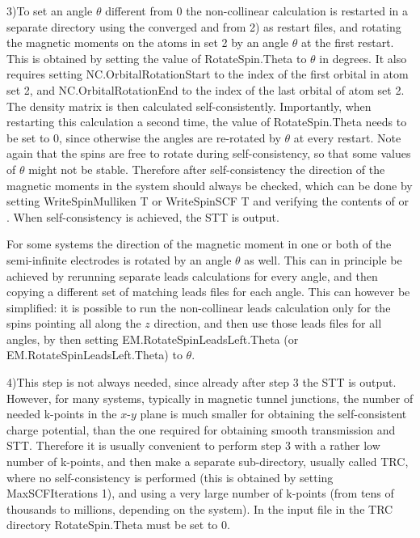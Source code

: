 \documentclass[11pt]{article}
\begin{document}
{3)To set an angle $\theta$ different from 0 the non-collinear calculation is restarted in a separate directory using the converged  and  from 2) as restart files, and rotating the magnetic moments on the atoms in set 2 by an angle $\theta$ at the first restart. This is obtained by setting the value of RotateSpin.Theta to $\theta$ in degrees. It also requires setting NC.OrbitalRotationStart to the index of the first orbital in atom set 2, and NC.OrbitalRotationEnd to the index of the last orbital of atom set 2. The density matrix is then calculated self-consistently. Importantly, when restarting this calculation a second time, the value of RotateSpin.Theta needs to be set to 0, since otherwise the angles are re-rotated by $\theta$ at every restart. Note again that the spins are free to rotate during self-consistency, so that some values of $\theta$ might not be stable. Therefore after self-consistency the direction of the magnetic moments in the system should always be checked, which can be done by setting WriteSpinMulliken T or WriteSpinSCF T and verifying the contents of  or . When self-consistency is achieved, the STT is output.

For some systems the direction of the magnetic moment in one or both of the semi-infinite electrodes is rotated by an angle $\theta$ as well. This can in principle be achieved by rerunning separate leads calculations for every angle, and then copying a different set of matching leads files for each angle. This can however be simplified: it is possible to run the non-collinear leads calculation only for the spins pointing all along the $z$ direction, and then use those leads files for all angles, by then setting EM.RotateSpinLeadsLeft.Theta (or EM.RotateSpinLeadsLeft.Theta) to $\theta$.

4)This step is not always needed, since already after step 3 the STT is output. However, for many systems, typically in magnetic tunnel junctions, the number of needed k-points in the $x$-$y$ plane is much smaller for obtaining the self-consistent charge potential, than the one required for obtaining smooth transmission and STT. Therefore it is usually convenient to perform step 3 with a rather low number of k-points, and then make a separate sub-directory, usually called TRC, where no self-consistency is performed (this is obtained by setting MaxSCFIterations 1), and using a very large number of k-points (from tens of thousands to millions, depending on the system). In the input file in the TRC directory RotateSpin.Theta must be set to 0.
\\

}
\end{document}
